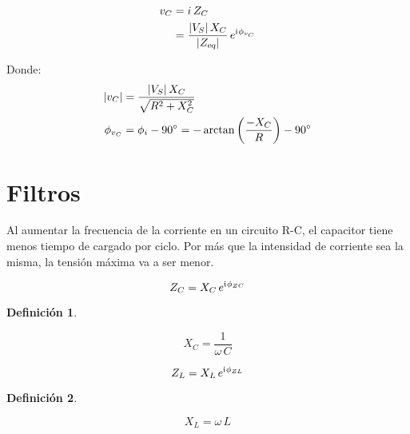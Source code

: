 \documentclass[a5paper,12pt,twoside]{book}
\newtheorem{defn}{{Definición}}[chapter]
\begin{document}
\begin{align*}
    v_C &= i \, Z_C
    \\
    &= \frac{{\left| {V_S} \right|} \, X_C}{{\left| {{{Z}_\textsl{{eq}}}} \right|}} \, e^{\mathrm{i}\mkern1mu \phi_{v_C}}
\end{align*}

Donde:
\begin{align*}
    {\left| {v_C} \right|} &= \frac{{\left| {V_S} \right|} \, X_C}{\sqrt{R^2 + X_C^2}}
    \\
    \phi_{v_C} &= \phi_i - \ang{90} = - \arctan{\left(\dfrac{-X_C}{R} \right)} - \ang{90}
\end{align*}




\section{Filtros}

Al aumentar la frecuencia de la corriente en un circuito R-C, el capacitor tiene menos tiempo de cargado por ciclo. Por más que la intensidad de corriente sea la misma, la tensión máxima va a ser menor.

\begin{equation*}
    Z_C = X_C \, e^{\mathrm{i}\mkern1mu \phi_{ZC}}
\end{equation*}

\begin{mdframed}[style=MyFrame1]
    \begin{defn}
    \end{defn}
    \begin{equation*}
        X_C = \frac{1}{\omega \, C}
    \end{equation*}
\end{mdframed}

\begin{equation*}
    Z_L = X_L \, e^{\mathrm{i}\mkern1mu \phi_{ZL}}
\end{equation*}

\begin{mdframed}[style=MyFrame1]
    \begin{defn}
    \end{defn}
    \begin{equation*}
        X_L = \omega \, L
    \end{equation*}
\end{mdframed}
\end{document}
